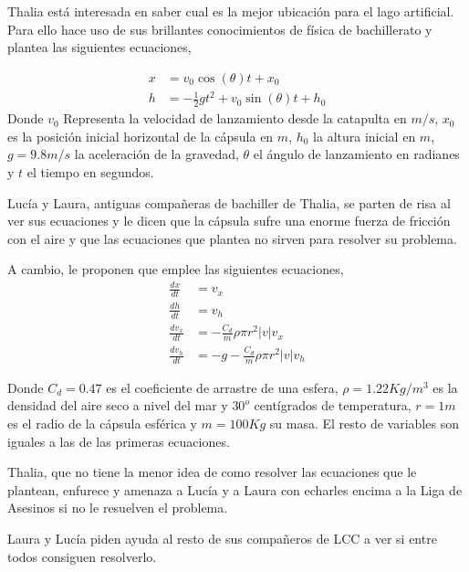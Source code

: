 Thalia está interesada en saber cual es la mejor ubicación para el lago artificial. Para ello hace uso de sus brillantes conocimientos de física de bachillerato y plantea las siguientes ecuaciones,

\begin{align}
	x &= v_0\cos(\theta)t + x_0 \label{eq1}\\
	h &= -\frac{1}{2}gt^2 + v_0\sin({\theta})t + h_0 \label{eq2}
\end{align}
Donde $v_0$ Representa la velocidad de lanzamiento desde la catapulta en $m/s$, $x_0$ es la posición inicial horizontal de la cápsula en $m$, $h_0$ la altura inicial en $m$, $g=9.8m/s$ la aceleración de la gravedad, $\theta$ el ángulo de lanzamiento en radianes y $t$ el tiempo en segundos.

Lucía y Laura, antiguas compañeras de bachiller de Thalia, se parten de risa al ver sus ecuaciones y le dicen que la cápsula sufre una enorme fuerza de fricción con el aire y que las ecuaciones que plantea no sirven para resolver su problema.

A cambio, le proponen que emplee las siguientes ecuaciones,
\begin{align}
	\frac{dx}{dt} &= v_x \label{eq3}\\
	\frac{dh}{dt} &= v_h\\
	\frac{dv_x}{dt} &= - \frac{C_d}{m}\rho\pi r^2|v|v_x\\
	\frac{dv_h}{dt} &= -g - \frac{C_d}{m}\rho\pi r^2|v|v_h \label{eq5}
\end{align}

Donde $C_d = 0.47$ es el coeficiente de arrastre de una esfera, $\rho = 1.22Kg/m^3$ es la densidad del aire seco a nivel del mar y $30^o$ centígrados de temperatura, $r = 1m$ es el radio de la cápsula esférica y $m=100Kg$ su masa. El resto de variables son iguales a las de las primeras ecuaciones.

Thalia, que no tiene la menor idea de como resolver las ecuaciones que le plantean, enfurece y amenaza a Lucía y a Laura con echarles encima a la Liga de Asesinos si no le resuelven el problema.

Laura y Lucía piden ayuda al resto de sus compañeros de LCC a ver si entre todos consiguen resolverlo.

